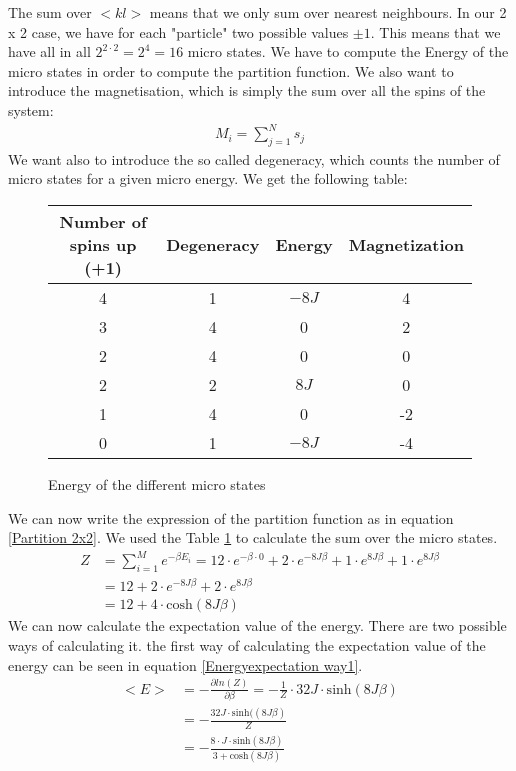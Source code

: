 \documentclass[10pt,a4paper]{article}
\begin{document}
The sum over $<kl>$ means that we only sum over nearest neighbours. In our 2 x 2 case, we have for each "particle" two possible values $\pm 1$. This means that we have all in all $2^{2 \cdot 2} = 2^4=16$ micro states. We have to compute the Energy of the micro states in order to compute the partition function. 
We also want to introduce the magnetisation, which is simply the sum over all the spins of the system:
\begin{align}
M_i=\sum_{j=1}^N s_j
\end{align}
We want also to introduce the so called degeneracy, which counts the number of micro states for a given micro energy. We get the following table:
\begin{figure}[h]
\centering
\caption{Energy of the different micro states}
\label{table of microstates}
\begin{tabular}{c|c|c|c}
Number of spins up (+1) & Degeneracy &  Energy & Magnetization\\
\hline \hline
4 & 1 & $-8J$ & 4 \\
3 & 4 & 0 & 2 \\
2 & 4 & 0 & 0 \\
2 & 2 & $8J$ & 0 \\
1 & 4 & 0 & -2 \\
0 & 1 & $-8J$ & -4 
\end{tabular}
\end{figure}
We can now write the expression of the partition function as in equation \ref{Partition 2x2}. We used the Table \ref{table of microstates} to calculate the sum over the micro states. 
\begin{align}
Z&= \sum_{i=1}^{M} e^{- \beta E_i}= 12 \cdot e^{-\beta \cdot 0 } + 2 \cdot e^{-8J \beta } + 1 \cdot e^{8J \beta } + 1 \cdot e^{8J \beta } \\
&= 12+ 2 \cdot e^{-8J \beta } + 2 \cdot e^{8J \beta } \\
&= 12+ 4 \cdot \mathrm{cosh} \left( 8J \beta \right) \label{Partition 2x2}
\end{align} 
We can now calculate the expectation value of the energy. There are two possible ways of calculating it. the first way of calculating the expectation value of the energy can be seen in equation \ref{Energyexpectation way1}. 
\begin{align}
<E>&= - \frac{\partial ln(Z)}{\partial \beta} =-\frac{1}{Z} \cdot 32J  \cdot \mathrm{sinh}(8J \beta ) \\ \label{Energyexpectation way1}
&= -\frac{32 J \cdot \mathrm{sinh}((8J \beta )}{Z}\\
&=-\frac{8 \cdot J \cdot  \mathrm{sinh}(8J \beta ) }{3+\mathrm{cosh}(8J\beta)}
\end{align}
\end{document}
